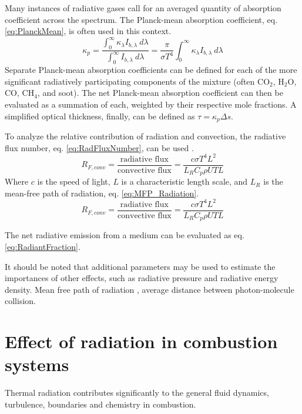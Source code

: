 Many instances of radiative gases call for an averaged quantity of absorption coefficient across the spectrum. The Planck-mean absorption coefficient, eq. \ref{eq:PlanckMean}, is often used in this context.
\begin{equation}
    \kappa{}_p = \frac{\int^\infty_0{\kappa{}_\lambda{}I_{b,\lambda}~d\lambda}}{\int^\infty_0{I_{b,\lambda}~d\lambda}}=\frac{\pi}{\sigma{}T^4}\int^\infty_0{\kappa{}_\lambda{}I_{b,\lambda}~d\lambda}
    \label{eq:PlanckMean}
\end{equation}
Separate Planck-mean absorption coefficients can be defined for each of the more significant radiatively participating components of the mixture (often CO$_2$, H$_2$O, CO, CH$_4$, and soot). The net Planck-mean absorption coefficient can then be evaluated as a summation of each, weighted by their respective mole fractions.
A simplified optical thickness, finally, can be defined as $\tau{}=\kappa{}_p\Delta{s}$.

To analyze the relative contribution of radiation and convection, the radiative flux number, eq. \ref{eq:RadFluxNumber}, can be used \cite{Pai1966RadiationDynamics}.
\begin{equation}
    R_{F,conv}=\frac{\text{radiative flux}}{\text{convective flux}}=\frac{c\sigma{}T^4L^2}{L_RC_p\rho{}UTL}
    \label{eq:RadFluxNumber}
\end{equation}
Where $c$ is the speed of light, $L$ is a characteristic length scale, and $L_R$ is the mean-free path of radiation, eq. \ref{eq:MFP_Radiation}.
\begin{equation}
    R_{F,conv}=\frac{\text{radiative flux}}{\text{convective flux}}=\frac{c\sigma{}T^4L^2}{L_RC_p\rho{}UTL}
    \label{eq:RadFluxNumber}
\end{equation}

The net radiative emission from a medium can be evaluated as eq. \ref{eq:RadiantFraction}.

It should be noted that additional parameters may be used to estimate the importances of other effects, such as radiative pressure and radiative energy density.
Mean free path of radiation \cite{Pai1966RadiationDynamics}, average distance between photon-molecule collision.



\section{Effect of radiation in combustion systems}

Thermal radiation contributes significantly to the general fluid dynamics, turbulence, boundaries and chemistry in combustion.

